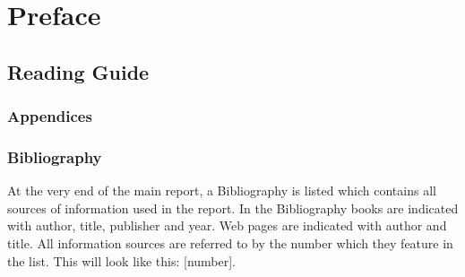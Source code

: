 \chapter*{Preface}

\section*{Reading Guide}


\subsection*{Appendices}


\subsection*{Bibliography} At the very end of the main report, a Bibliography is listed which contains all sources of information used in the report. In the Bibliography books are indicated with author, title, publisher and year. Web pages are indicated with author and title. All information sources are referred to by the number which they feature in the list. This will look like this: [number]. %